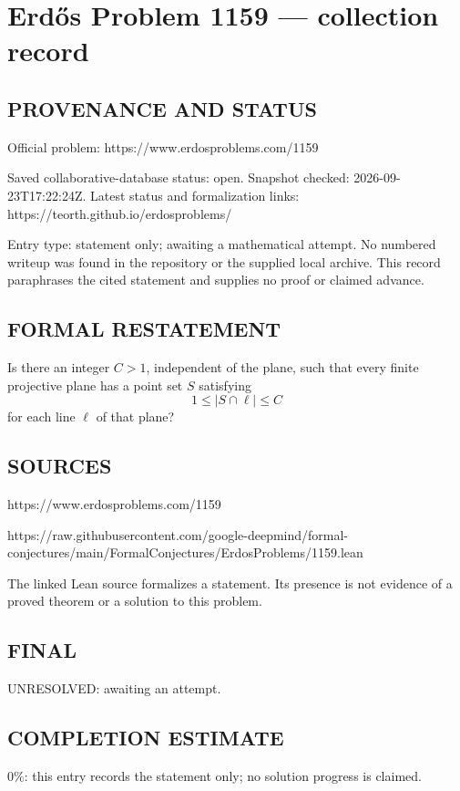 \section*{Erd\H{o}s Problem 1159 --- collection record}

\subsection*{PROVENANCE AND STATUS}
Official problem: https://www.erdosproblems.com/1159

Saved collaborative-database status: open.
Snapshot checked: 2026-09-23T17:22:24Z.
Latest status and formalization links: https://teorth.github.io/erdosproblems/

Entry type: statement only; awaiting a mathematical attempt. No numbered writeup was found in the repository or the supplied local archive. This record paraphrases the cited statement and supplies no proof or claimed advance.

\subsection*{FORMAL RESTATEMENT}
Is there an integer $C>1$, independent of the plane, such that every finite projective plane has a point set $S$ satisfying
\[
1\leq |S\cap\ell|\leq C
\]
for each line $\ell$ of that plane?

\subsection*{SOURCES}
https://www.erdosproblems.com/1159

https://raw.githubusercontent.com/google-deepmind/formal-conjectures/main/FormalConjectures/ErdosProblems/1159.lean

The linked Lean source formalizes a statement. Its presence is not evidence of a proved theorem or a solution to this problem.

\subsection*{FINAL}
UNRESOLVED: awaiting an attempt.

\subsection*{COMPLETION ESTIMATE}
$0\%$: this entry records the statement only; no solution progress is claimed.
